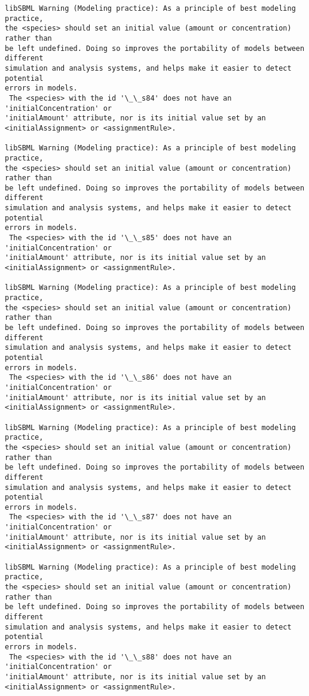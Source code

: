 \documentclass[11pt]{article}
\begin{document}
\begin{Verbatim}[commandchars=\\\{\}]
libSBML Warning (Modeling practice): As a principle of best modeling practice,
the <species> should set an initial value (amount or concentration) rather than
be left undefined. Doing so improves the portability of models between different
simulation and analysis systems, and helps make it easier to detect potential
errors in models.
 The <species> with the id '\_\_s84' does not have an 'initialConcentration' or
'initialAmount' attribute, nor is its initial value set by an
<initialAssignment> or <assignmentRule>.

libSBML Warning (Modeling practice): As a principle of best modeling practice,
the <species> should set an initial value (amount or concentration) rather than
be left undefined. Doing so improves the portability of models between different
simulation and analysis systems, and helps make it easier to detect potential
errors in models.
 The <species> with the id '\_\_s85' does not have an 'initialConcentration' or
'initialAmount' attribute, nor is its initial value set by an
<initialAssignment> or <assignmentRule>.

libSBML Warning (Modeling practice): As a principle of best modeling practice,
the <species> should set an initial value (amount or concentration) rather than
be left undefined. Doing so improves the portability of models between different
simulation and analysis systems, and helps make it easier to detect potential
errors in models.
 The <species> with the id '\_\_s86' does not have an 'initialConcentration' or
'initialAmount' attribute, nor is its initial value set by an
<initialAssignment> or <assignmentRule>.

libSBML Warning (Modeling practice): As a principle of best modeling practice,
the <species> should set an initial value (amount or concentration) rather than
be left undefined. Doing so improves the portability of models between different
simulation and analysis systems, and helps make it easier to detect potential
errors in models.
 The <species> with the id '\_\_s87' does not have an 'initialConcentration' or
'initialAmount' attribute, nor is its initial value set by an
<initialAssignment> or <assignmentRule>.

libSBML Warning (Modeling practice): As a principle of best modeling practice,
the <species> should set an initial value (amount or concentration) rather than
be left undefined. Doing so improves the portability of models between different
simulation and analysis systems, and helps make it easier to detect potential
errors in models.
 The <species> with the id '\_\_s88' does not have an 'initialConcentration' or
'initialAmount' attribute, nor is its initial value set by an
<initialAssignment> or <assignmentRule>.


\end{Verbatim}
\end{document}

